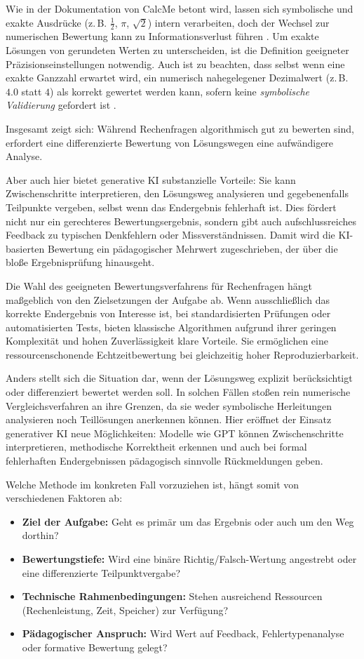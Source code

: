 \documentclass[a4paper,12pt]{article}
\begin{document}
Wie in der Dokumentation von CalcMe betont wird, lassen sich symbolische und exakte Ausdrücke (z.\,B. $\frac{1}{2}$, $\pi$, $\sqrt{2}$) intern verarbeiten, doch der Wechsel zur numerischen Bewertung kann zu Informationsverlust führen \parencite{calcme}. Um exakte Lösungen von gerundeten Werten zu unterscheiden, ist die Definition geeigneter Präzisionseinstellungen notwendig. Auch ist zu beachten, dass selbst wenn eine exakte Ganzzahl erwartet wird, ein numerisch nahegelegener Dezimalwert (z.\,B. $4.0$ statt $4$) als korrekt gewertet werden kann, sofern keine \textit{symbolische Validierung} gefordert ist \parencite{calcme}.

Insgesamt zeigt sich: Während Rechenfragen algorithmisch gut zu bewerten sind, erfordert eine differenzierte Bewertung von Lösungswegen eine aufwändigere Analyse.

Aber auch hier bietet generative KI substanzielle Vorteile: Sie kann Zwischenschritte interpretieren, den Lösungsweg analysieren und gegebenenfalls Teilpunkte vergeben, selbst wenn das Endergebnis fehlerhaft ist. Dies fördert nicht nur ein gerechteres Bewertungsergebnis, sondern gibt auch aufschlussreiches Feedback zu typischen Denkfehlern oder Missverständnissen. Damit wird die KI-basierten Bewertung ein pädagogischer Mehrwert zugeschrieben, der über die bloße Ergebnisprüfung hinausgeht.

Die Wahl des geeigneten Bewertungsverfahrens für Rechenfragen hängt maßgeblich von den Zielsetzungen der Aufgabe ab. Wenn ausschließlich das korrekte Endergebnis von Interesse ist, bei standardisierten Prüfungen oder automatisierten Tests, bieten klassische Algorithmen aufgrund ihrer geringen Komplexität und hohen Zuverlässigkeit klare Vorteile. Sie ermöglichen eine ressourcenschonende Echtzeitbewertung bei gleichzeitig hoher Reproduzierbarkeit.

Anders stellt sich die Situation dar, wenn der Lösungsweg explizit berücksichtigt oder differenziert bewertet werden soll. In solchen Fällen stoßen rein numerische Vergleichsverfahren an ihre Grenzen, da sie weder symbolische Herleitungen analysieren noch Teillösungen anerkennen können. Hier eröffnet der Einsatz generativer KI neue Möglichkeiten: Modelle wie GPT können Zwischenschritte interpretieren, methodische Korrektheit erkennen und auch bei formal fehlerhaften Endergebnissen pädagogisch sinnvolle Rückmeldungen geben.

Welche Methode im konkreten Fall vorzuziehen ist, hängt somit von verschiedenen Faktoren ab:
\begin{itemize}
  \item \textbf{Ziel der Aufgabe:} Geht es primär um das Ergebnis oder auch um den Weg dorthin?
  \item \textbf{Bewertungstiefe:} Wird eine binäre Richtig/Falsch-Wertung angestrebt oder eine differenzierte Teilpunktvergabe?
  \item \textbf{Technische Rahmenbedingungen:} Stehen ausreichend Ressourcen (Rechenleistung, Zeit, Speicher) zur Verfügung?
  \item \textbf{Pädagogischer Anspruch:} Wird Wert auf Feedback, Fehlertypenanalyse oder formative Bewertung gelegt?
\end{itemize}
\end{document}
